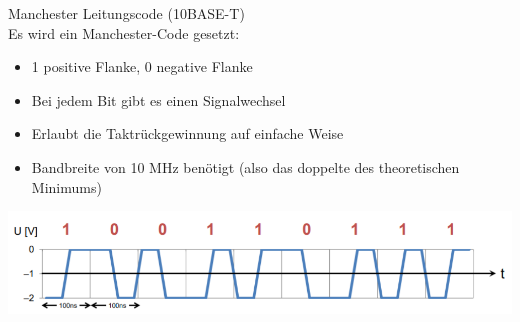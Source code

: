 \begin{concept}{Manchester Leitungscode (10BASE-T)}\\
    Es wird ein Manchester-Code gesetzt:
    \begin{itemize}
        \item 1 positive Flanke, 0 negative Flanke
        \item Bei jedem Bit gibt es einen Signalwechsel
        \item Erlaubt die Taktrückgewinnung auf einfache Weise
        \item Bandbreite von 10 MHz benötigt (also das doppelte des theoretischen Minimums)
    \end{itemize}
        \includegraphics[width=0.8\linewidth]{images/leitungscode.png}
\end{concept}

